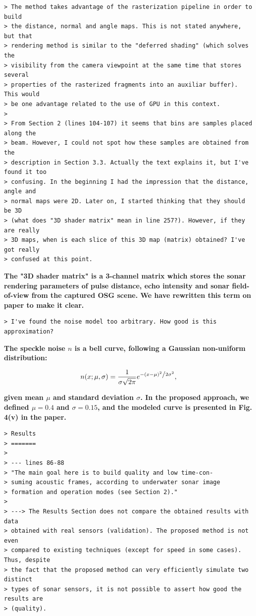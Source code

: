 \documentclass{article}
\begin{document}
\begin{verbatim}
> The method takes advantage of the rasterization pipeline in order to build
> the distance, normal and angle maps. This is not stated anywhere, but that
> rendering method is similar to the "deferred shading" (which solves the
> visibility from the camera viewpoint at the same time that stores several
> properties of the rasterized fragments into an auxiliar buffer). This would
> be one advantage related to the use of GPU in this context.
>
> From Section 2 (lines 104-107) it seems that bins are samples placed along the
> beam. However, I could not spot how these samples are obtained from the
> description in Section 3.3. Actually the text explains it, but I've found it too
> confusing. In the beginning I had the impression that the distance, angle and
> normal maps were 2D. Later on, I started thinking that they should be 3D
> (what does "3D shader matrix" mean in line 257?). However, if they are really
> 3D maps, when is each slice of this 3D map (matrix) obtained? I've got really
> confused at this point.
\end{verbatim}

\textbf{The "3D shader matrix" is a 3-channel matrix which stores the sonar rendering parameters of pulse distance, echo intensity and sonar field-of-view from the captured OSG scene. We have rewritten this term on paper to make it clear.}

\begin{verbatim}
> I've found the noise model too arbitrary. How good is this approximation?
\end{verbatim}

\textbf{The speckle noise $n$ is a bell curve, following a Gaussian non-uniform
distribution:}

\begin{equation*}
n(x;\mu,\sigma) = \frac{1}{{\sigma \sqrt {2\pi } }}e^{{{ - \left( {x - \mu } \right)^2 } \mathord{\left/ {\vphantom {{ - \left( {x - \mu } \right)^2 } {2\sigma ^2 }}} \right. \kern-\nulldelimiterspace} {2\sigma ^2 }}},
\end{equation*}

\textbf{given mean $\mu$ and standard deviation $\sigma$. In the proposed approach, we defined $\mu = 0.4$ and $\sigma = 0.15$, and the modeled curve is presented in Fig. 4(v) in the paper.}

\begin{verbatim}
> Results
> =======
>
> --- lines 86-88
> "The main goal here is to build quality and low time-con-
> suming acoustic frames, according to underwater sonar image
> formation and operation modes (see Section 2)."
>
> ---> The Results Section does not compare the obtained results with data
> obtained with real sensors (validation). The proposed method is not even
> compared to existing techniques (except for speed in some cases). Thus, despite
> the fact that the proposed method can very efficiently simulate two distinct
> types of sonar sensors, it is not possible to assert how good the results are
> (quality).
\end{verbatim}
\end{document}
